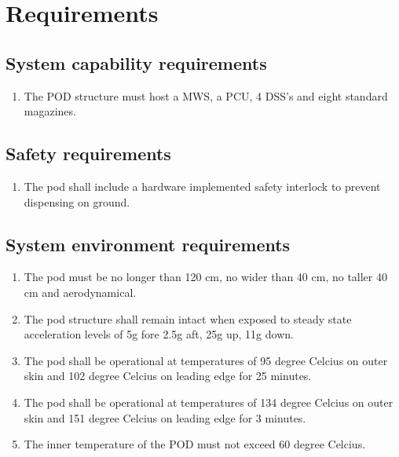 \documentclass[Main]{subfiles}
\begin{document}
\chapter{Requirements}

\section{System capability requirements}
\begin{enumerate}[{SR}-1.1]
\item The POD structure must host a MWS, a PCU, 4 DSS's and eight standard magazines.

\end{enumerate}

\section{Safety requirements}
\begin{enumerate}[{SR}-2.1]
\item The pod shall include a hardware implemented safety interlock to prevent dispensing on ground.

\end{enumerate}

\section{System environment requirements} 
\label{sec:SER}

\begin{enumerate}[{SR}-3.1]
\item The pod must be no longer than 120 cm, no wider than 40 cm, no taller 40 cm and aerodynamical.

\item The pod structure shall remain intact when exposed to steady state acceleration levels of 5g fore 2.5g aft, 25g up, 11g down.

\item The pod shall be operational at temperatures of 95 degree Celcius on outer skin and 102 degree Celcius on leading edge for 25 minutes.

\item The pod shall be operational at temperatures of 134 degree Celcius on outer skin and 151 degree Celcius on leading edge for 3 minutes.

\item The inner temperature of the POD must not exceed 60 degree Celcius.

\end{enumerate}
\end{document}
